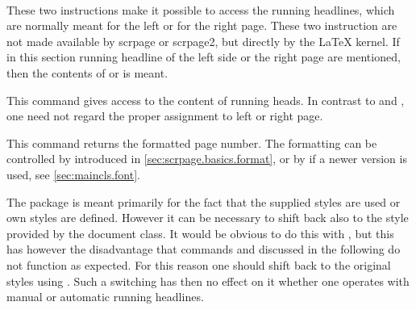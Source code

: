 \begin{Declaration}
  \\
\end{Declaration}%
%
These two instructions make it possible to access the running headlines,
which are normally meant for the left or for the right page. These two
instruction are not made available by scrpage or scrpage2, but directly
by the \LaTeX{} kernel. If in this section running headline of the
left side or the right page are mentioned,
then the contents of  or 
is meant.
%
%

\begin{Declaration}
\end{Declaration}%
This command gives access to the content of running heads.
In contrast to  and , one
need not regard the proper assignment to left or right page.

\begin{Declaration}
\end{Declaration}%
This command returns the formatted page number. The formatting can be
controlled by  introduced in
\autoref{sec:scrpage.basics.format}, 
or by  if a newer version \KOMAScript{} is used, see
\autoref{sec:maincls.font}.

\begin{Declaration}
\end{Declaration}%
\label{desc:scrpage.pagestyle.useheadings}%
The package  is meant primarily for the fact that the
supplied styles are used or own styles are defined. However it can be
necessary to shift back also to the style provided by the document class.  It
would be obvious to do this with , but
this has however the disadvantage that commands  and
 discussed in the following do not function as expected.
For this reason one should shift back to the original styles using
.  Such a switching has then no
effect on it whether one operates with manual or automatic running headlines.
%

